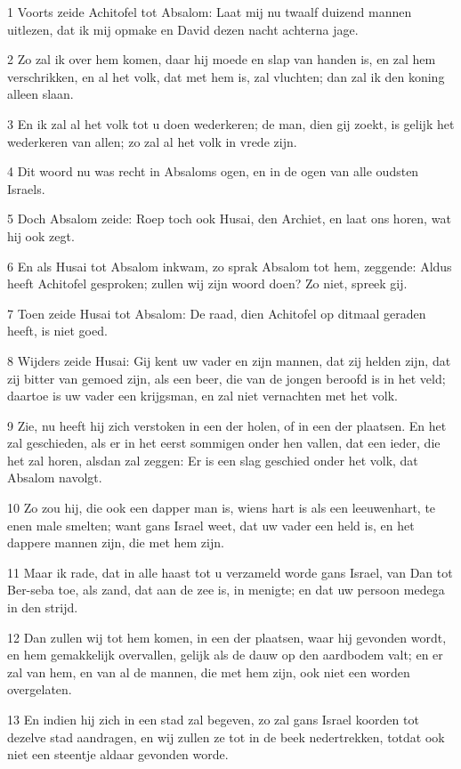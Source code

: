 \par 1 Voorts zeide Achitofel tot Absalom: Laat mij nu twaalf duizend mannen uitlezen, dat ik mij opmake en David dezen nacht achterna jage.
\par 2 Zo zal ik over hem komen, daar hij moede en slap van handen is, en zal hem verschrikken, en al het volk, dat met hem is, zal vluchten; dan zal ik den koning alleen slaan.
\par 3 En ik zal al het volk tot u doen wederkeren; de man, dien gij zoekt, is gelijk het wederkeren van allen; zo zal al het volk in vrede zijn.
\par 4 Dit woord nu was recht in Absaloms ogen, en in de ogen van alle oudsten Israels.
\par 5 Doch Absalom zeide: Roep toch ook Husai, den Archiet, en laat ons horen, wat hij ook zegt.
\par 6 En als Husai tot Absalom inkwam, zo sprak Absalom tot hem, zeggende: Aldus heeft Achitofel gesproken; zullen wij zijn woord doen? Zo niet, spreek gij.
\par 7 Toen zeide Husai tot Absalom: De raad, dien Achitofel op ditmaal geraden heeft, is niet goed.
\par 8 Wijders zeide Husai: Gij kent uw vader en zijn mannen, dat zij helden zijn, dat zij bitter van gemoed zijn, als een beer, die van de jongen beroofd is in het veld; daartoe is uw vader een krijgsman, en zal niet vernachten met het volk.
\par 9 Zie, nu heeft hij zich verstoken in een der holen, of in een der plaatsen. En het zal geschieden, als er in het eerst sommigen onder hen vallen, dat een ieder, die het zal horen, alsdan zal zeggen: Er is een slag geschied onder het volk, dat Absalom navolgt.
\par 10 Zo zou hij, die ook een dapper man is, wiens hart is als een leeuwenhart, te enen male smelten; want gans Israel weet, dat uw vader een held is, en het dappere mannen zijn, die met hem zijn.
\par 11 Maar ik rade, dat in alle haast tot u verzameld worde gans Israel, van Dan tot Ber-seba toe, als zand, dat aan de zee is, in menigte; en dat uw persoon medega in den strijd.
\par 12 Dan zullen wij tot hem komen, in een der plaatsen, waar hij gevonden wordt, en hem gemakkelijk overvallen, gelijk als de dauw op den aardbodem valt; en er zal van hem, en van al de mannen, die met hem zijn, ook niet een worden overgelaten.
\par 13 En indien hij zich in een stad zal begeven, zo zal gans Israel koorden tot dezelve stad aandragen, en wij zullen ze tot in de beek nedertrekken, totdat ook niet een steentje aldaar gevonden worde.
